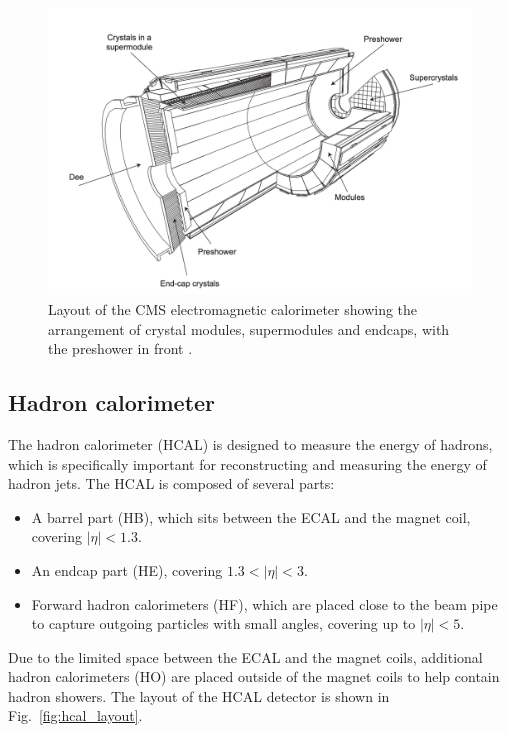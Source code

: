 \begin{figure}
    \begin{minipage}[t]{\linewidth}\centering
        \includegraphics[width=15cm]{ecal_layout.png}
    \end{minipage}
    \caption{Layout of the CMS electromagnetic calorimeter showing the arrangement of crystal
    modules, supermodules and endcaps, with the preshower in front \cite{cms:cms_experiment}.}
    \label{fig:ecal_layout}
\end{figure}


\subsection{Hadron calorimeter}
\label{subsec:hcal}

The hadron calorimeter (HCAL) is designed to measure the energy of hadrons, which is specifically important for reconstructing and measuring the energy of
hadron jets. The HCAL is composed of several parts: 

\begin{itemize}
    \item A barrel part (HB), which sits between the ECAL and the magnet coil, covering $|\eta| < 1.3$. 
    \item An endcap part (HE), covering $1.3 < |\eta|< 3$.
    \item Forward hadron calorimeters (HF), which are placed close to the beam pipe to capture outgoing particles with small angles, covering up to $|\eta| < 5$.
\end{itemize}

Due to the limited space between the ECAL and the magnet coils, additional hadron calorimeters (HO) are placed outside of the magnet coils to help 
contain hadron showers. The layout of the HCAL detector is shown in Fig.~\ref{fig:hcal_layout}.

